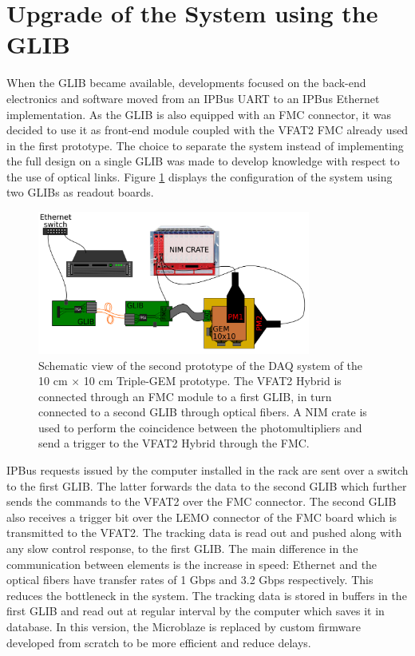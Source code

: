   \section{Upgrade of the System using the GLIB}

    When the GLIB became available, developments focused on the back-end electronics and software moved from an IPBus UART to an IPBus Ethernet implementation. As the GLIB is also equipped with an FMC connector, it was decided to use it as front-end module coupled with the VFAT2 FMC already used in the first prototype. The choice to separate the system instead of implementing the full design on a single GLIB was made to develop knowledge with respect to the use of optical links. Figure \ref{fig:III-1-sys-2} displays the configuration of the system using two GLIBs as readout boards. \\

    \begin{figure}[h!]
      \centering
      \includegraphics[width=0.8\textwidth]{img/III-1-arch/sys_2.png}
      \caption{Schematic view of the second prototype of the DAQ system of the 10 cm $ \times $ 10 cm Triple-GEM prototype. The VFAT2 Hybrid is connected through an FMC module to a first GLIB, in turn connected to a second GLIB through optical fibers. A NIM crate is used to perform the coincidence between the photomultipliers and send a trigger to the VFAT2 Hybrid through the FMC.}
      \label{fig:III-1-sys-2}
    \end{figure}

    IPBus requests issued by the computer installed in the rack are sent over a switch to the first GLIB. The latter forwards the data to the second GLIB which further sends the commands to the VFAT2 over the FMC connector. The second GLIB also receives a trigger bit over the LEMO connector of the FMC board which is transmitted to the VFAT2. The tracking data is read out and pushed along with any slow control response, to the first GLIB. The main difference in the communication between elements is the increase in speed: Ethernet and the optical fibers have transfer rates of 1 Gbps and 3.2 Gbps respectively. This reduces the bottleneck in the system. The tracking data is stored in buffers in the first GLIB and read out at regular interval by the computer which saves it in database. In this version, the Microblaze is replaced by custom firmware developed from scratch to be more efficient and reduce delays.

